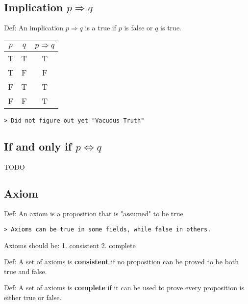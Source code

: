 \documentclass[12pt,a4paper]{article}
\begin{document}
\subsection*{Implication $p \Rightarrow q$}
Def: An implication $p \Rightarrow q$ is a true if $p$ is false or $q$ is true.

\begin{tabular}{|c|c|c|}
\hline
$p$ & $q$ & $p \Rightarrow q$ \\
\hline
T & T & T \\
T & F & F \\
F & T & T \\
F & F & T \\
\hline
\end{tabular}

\texttt{> Did not figure out yet "Vacuous Truth" }


\subsection*{If and only if $p \Leftrightarrow q$}
{TODO}
\subsection*{Axiom}
Def: An axiom is a proposition that is "assumed" to be true

\texttt{> Axioms can be true in some fields, while false in others.}

Axioms should be: 1. consistent 2. complete

Def: A set of axioms is \textbf{consistent} if no proposition can be proved to be both true and false.

Def: A set of axioms is \textbf{complete} if it can be used to prove every proposition is either true or false.
\end{document}
